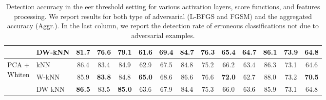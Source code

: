 \begin{table}
\begin{tabularx}{\linewidth}{Xlcccccccccccc}
                                                         & DW-kNN & 81.7          & 76.6          & 79.1          & 61.6          & 69.4          & 84.7          & 76.3          & 65.4          & 64.7          & 86.1          & 73.9          & 64.8          \\ \midrule
\multirow{3}{*}{\parbox[c][1.2cm]{1.2cm}{PCA +\\Whiten}} &    kNN & 86.4          & 83.4          & 84.9          & 62.9          & 67.5          & 84.8          & 75.2          & 66.2          & 63.4          & 86.3          & 73.1          & 64.6          \\
                                                         &  W-kNN & 85.9          & \textbf{83.8} & 84.8          & \textbf{65.0} & 68.6          & 86.6          & 76.6          & \textbf{72.0} & 62.7          & 88.0          & 73.2          & \textbf{70.5} \\
                                                         & DW-kNN & \textbf{86.5} & 83.5          & \textbf{85.0} & 63.6          & 67.9          & 84.4          & 75.3          & 66.0          & 63.6          & 85.9          & 73.1          & 64.8          \\
\bottomrule
\end{tabularx}
\caption{Detection accuracy in the \gls{eer} threshold setting for various activation layers, score functions, and features processing.
We report results for both type of adversarial (L-BFGS and FGSM) and the aggregated accuracy (Aggr.).
In the last column, we report the detection rate of erroneous classifications not due to adversarial examples.}
\label{tab:adv:eer}
\end{table}

